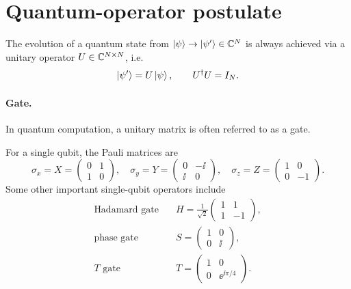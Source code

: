 \section{Quantum-operator postulate}\label{sec:sec01-operator}

\begin{definition}
The evolution of a quantum state from $\ket{\psi} \to \ket{\psi'} \in \mathbb{C}^N$ is
always achieved via a unitary operator $U \in \mathbb{C}^{N \times N}$, i.e.
\begin{equation}
  \ket{\psi'} = U\ket{\psi}, \qquad U^{\dagger} U = I_N.
\end{equation}
\end{definition}

\paragraph{Gate.} In quantum computation, a unitary matrix is often referred to
as a gate.

\begin{example}
For a single qubit, the Pauli matrices are
\begin{equation}
  \sigma_x = X = \begin{pmatrix} 0 & 1 \\ 1 & 0 \end{pmatrix}, \quad
  \sigma_y = Y = \begin{pmatrix} 0 & -\ii \\ \ii & 0 \end{pmatrix}, \quad
  \sigma_z = Z = \begin{pmatrix} 1 & 0 \\ 0 & -1 \end{pmatrix}.
\end{equation}
Some other important single-qubit operators include
\begin{align}
  \text{Hadamard gate} \quad & H = \frac{1}{\sqrt{2}}\begin{pmatrix} 1 & 1 \\ 1 & -1 \end{pmatrix}, \\
  \text{phase gate} \quad & S = \begin{pmatrix} 1 & 0 \\ 0 & \ii \end{pmatrix}, \\
  T \text{ gate} \quad & T = \begin{pmatrix} 1 & 0 \\ 0 & \ee^{\ii\pi/4} \end{pmatrix}.
\end{align}
\end{example}

